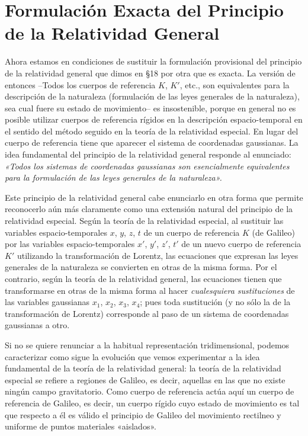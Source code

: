 \documentclass[spanish]{book}
\begin{document}
\chapter{Formulación Exacta del Principio de la Relatividad General}

Ahora estamos en condiciones de sustituir la formulación provisional del principio de
la relatividad general que dimos en \S 18 por otra que es exacta. La versión de entonces
--Todos los cuerpos de referencia $K$, $K'$, etc., son equivalentes para la descripción de
la naturaleza (formulación de las leyes generales de la naturaleza), sea cual fuere su
estado de movimiento-- es insostenible, porque en general no es posible utilizar
cuerpos de referencia rígidos en la descripción espacio-temporal en el sentido del
método seguido en la teoría de la relatividad especial. En lugar del cuerpo de referencia
tiene que aparecer el sistema de coordenadas gaussianas. La idea fundamental del
principio de la relatividad general responde al enunciado: \textit{«Todos los sistemas de
coordenadas gaussianas son esencialmente equivalentes para la formulación de las leyes
generales de la naturaleza».}

Este principio de la relatividad general cabe enunciarlo en otra forma que permite
reconocerlo aún más claramente como una extensión natural del principio de la
relatividad especial. Según la teoría de la relatividad especial, al sustituir las variables
espacio-temporales $x$, $y$, $z$, $t$ de un cuerpo de referencia $K$ (de Galileo) por las
variables espacio-temporales $x'$, $y'$, $z'$, $t'$ de un nuevo cuerpo de referencia $K'$ utilizando
la transformación de Lorentz, las ecuaciones que expresan las leyes generales de la
naturaleza se convierten en otras de la misma forma. Por el contrario, según la teoría de
la relatividad general, las ecuaciones tienen que transformarse en otras de la misma
forma al hacer \textit{cualesquiera sustituciones} de las variables gaussianas $x_{1}$, $x_{2}$, $x_{3}$, $x_{4}$; pues
toda sustitución (y no sólo la de la transformación de Lorentz) corresponde al paso de
un sistema de coordenadas gaussianas a otro.

Si no se quiere renunciar a la habitual representación tridimensional, podemos
caracterizar como sigue la evolución que vemos experimentar a la idea fundamental de
la teoría de la relatividad general: la teoría de la relatividad especial se refiere a
regiones de Galileo, es decir, aquellas en las que no existe ningún campo gravitatorio.
Como cuerpo de referencia actúa aquí un cuerpo de referencia de Galileo, es decir,
un cuerpo rígido cuyo estado de movimiento es tal que respecto a él es válido el
principio de Galileo del movimiento rectilneo y uniforme de puntos materiales
«aislados».
\end{document}
